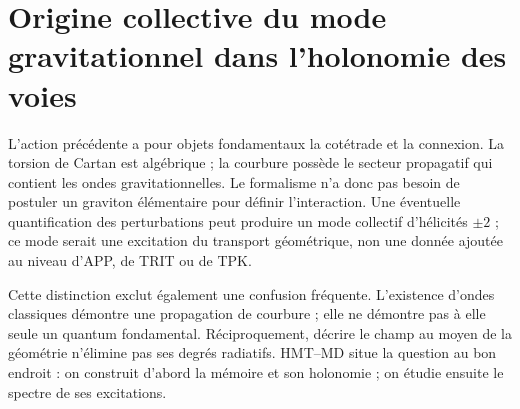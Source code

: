 \section{Origine collective du mode gravitationnel dans l'holonomie des voies}

L'action précédente a pour objets fondamentaux la cotétrade et la connexion.
La torsion de Cartan est algébrique ; la courbure possède le secteur propagatif qui
contient les ondes gravitationnelles. Le formalisme n'a donc pas besoin de
postuler un graviton élémentaire pour définir l'interaction. Une éventuelle
quantification des perturbations peut produire un mode collectif
d'hélicités \(\pm2\) ; ce mode serait une excitation du transport
géométrique, non une donnée ajoutée au niveau d'APP, de TRIT ou de TPK.

Cette distinction exclut également une confusion fréquente. L'existence
d'ondes classiques démontre une propagation de courbure ; elle ne démontre pas à elle seule
un quantum fondamental. Réciproquement, décrire le champ au moyen de la
géométrie n'élimine pas ses degrés radiatifs. HMT--MD situe la question au
bon endroit : on construit d'abord la mémoire et son holonomie ; on étudie ensuite
le spectre de ses excitations.
